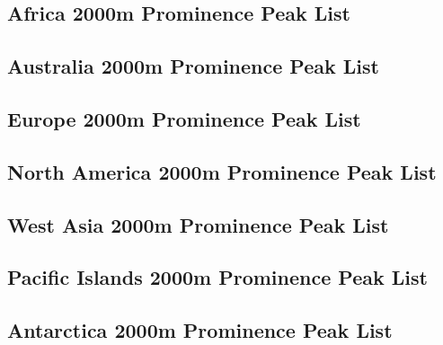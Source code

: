 \documentclass[10pt,twocolumn,letterpaper]{article}
\begin{document}
\subsection{Africa 2000m Prominence Peak List}

\subsection{Australia 2000m Prominence Peak List}

\subsection{Europe 2000m Prominence Peak List}

\subsection{North America 2000m Prominence Peak List}

\subsection{West Asia 2000m Prominence Peak List}

\subsection{Pacific Islands 2000m Prominence Peak List}

\subsection{Antarctica 2000m Prominence Peak List}


\clearpage
\twocolumn

{\small


}
\end{document}
